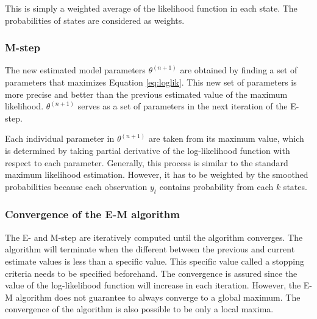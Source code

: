 This is simply a weighted average of the likelihood function in each
state. The probabilities of states are considered as weights.

\subsubsection{M-step}

The new estimated model parameters $\theta^{(n+1)}$ are obtained
by finding a set of parameters that maximizes Equation \ref{eq:loglik}.
This new set of parameters is more precise and better than the previous
estimated value of the maximum likelihood. $\theta^{(n+1)}$ serves
as a set of parameters in the next iteration of the E-step. 

Each individual parameter in $\theta^{(n+1)}$ are taken from its
maximum value, which is determined by taking partial derivative of
the log-likelihood function with respect to each parameter. Generally,
this process is similar to the standard maximum likelihood estimation.
However, it has to be weighted by the smoothed probabilities because
each observation $y_{t}$ contains probability from each $k$ states.

\subsubsection{Convergence of the E-M algorithm}

The E- and M-step are iteratively computed until the algorithm converges.
The algorithm will terminate when the different between the previous
and current estimate values is less than a specific value. This specific
value called a stopping criteria needs to be specified beforehand.
The convergence is assured since the value of the log-likelihood function
will increase in each iteration. However, the E-M algorithm does not
guarantee to always converge to a global maximum. The convergence
of the algorithm is also possible to be only a local maxima. %


